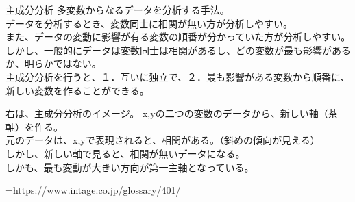 \documentclass[dvipdfmx,autodetect-engine, unicode, 10pt, aspectratio=169]{beamer}
\begin{document}
\begin{frame}{主成分分析}
    \small
    多変数からなるデータを分析する手法。\\
    データを分析するとき、変数同士に相関が無い方が分析しやすい。  \\
    また、データの変動に影響が有る変数の順番が分かっていた方が分析しやすい。\\
    しかし、一般的にデータは変数同士は相関があるし、どの変数が最も影響があるか、明らかではない。\\
    主成分分析を行うと、１．互いに独立で、２．最も影響がある変数から順番に、新しい変数を作ることができる。

    \begin{minipage}{0.45\linewidth}\scriptsize
        右は、主成分分析のイメージ。
        x,yの二つの変数のデータから、新しい軸（茶軸）を作る。\\
        元のデータは、x,yで表現されると、相関がある。（斜めの傾向が見える）\\
        しかし、新しい軸で見ると、相関が無いデータになる。\\
        しかも、最も変動が大きい方向が第一主軸となっている。
    \end{minipage}
    \begin{minipage}{0.45\linewidth}
    \begin{center}
        \caption{\tiny =https://www.intage.co.jp/glossary/401/}
    \end{center}
    \end{minipage}
\end{frame}
\end{document}
